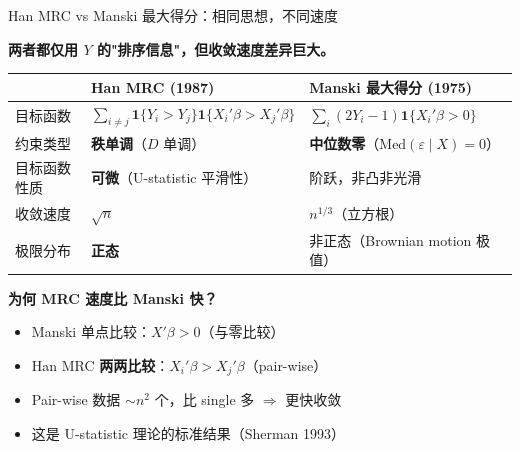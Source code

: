 \documentclass[aspectratio=169, 10pt]{beamer}
\begin{document}
\begin{frame}{Han MRC vs Manski 最大得分：相同思想，不同速度}

  \textbf{两者都仅用 $Y$ 的"排序信息"，但收敛速度差异巨大。}

  \begin{center}\footnotesize
  \begin{tabular}{p{2.5cm}|p{5cm}|p{5cm}}
  \hline
  & \textbf{Han MRC (1987)} & \textbf{Manski 最大得分 (1975)} \\
  \hline
  目标函数 & $\sum_{i \neq j} \mathbf{1}\{Y_i > Y_j\} \mathbf{1}\{X_i'\beta > X_j'\beta\}$ &
  $\sum_i (2Y_i-1) \mathbf{1}\{X_i'\beta > 0\}$ \\
  \hline
  约束类型 & \textbf{秩单调}（$D$ 单调）& \textbf{中位数零}（$\text{Med}(\varepsilon\mid X) = 0$）\\
  \hline
  目标函数性质 & \textbf{可微}（U-statistic 平滑性）& 阶跃，非凸非光滑 \\
  \hline
  收敛速度 & \textbf{$\sqrt{n}$} & $n^{1/3}$（立方根）\\
  \hline
  极限分布 & \textbf{正态} & 非正态（Brownian motion 极值）\\
  \hline
  \end{tabular}
  \end{center}

  \begin{keybox}
    \textbf{为何 MRC 速度比 Manski 快？}
    \begin{itemize}\setlength{\itemsep}{1pt}
      \item Manski 单点比较：$X'\beta > 0$（与零比较）
      \item Han MRC \textbf{两两比较}：$X_i'\beta > X_j'\beta$（pair-wise）
      \item Pair-wise 数据 $\sim n^2$ 个，比 single 多 $\Rightarrow$ 更快收敛
      \item 这是 U-statistic 理论的标准结果（Sherman 1993）
    \end{itemize}
  \end{keybox}

\end{frame}
\end{document}
